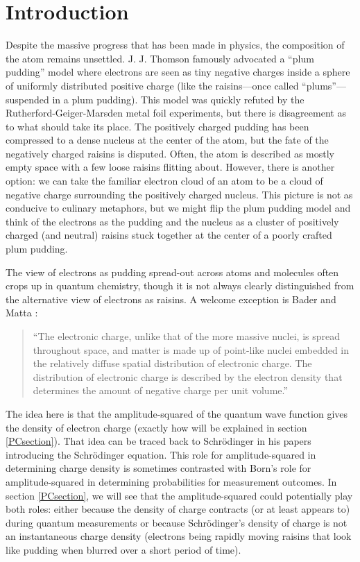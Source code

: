 \documentclass[12pt,onecolumn,secnumarabic,amsmath,amssymb,balancelastpage,nofootinbib]{article}
\begin{document}
\section{Introduction}\label{introsec}

Despite the massive progress that has been made in physics, the composition of the atom remains unsettled.  J. J. Thomson \cite{thomson1904} famously advocated a ``plum pudding'' model where electrons are seen as tiny negative charges inside a sphere of uniformly distributed positive charge (like the raisins---once called ``plums''---suspended in a plum pudding).  This model was quickly refuted by the Rutherford-Geiger-Marsden metal foil experiments, but there is disagreement as to what should take its place.  The positively charged pudding has been compressed to a dense nucleus at the center of the atom, but the fate of the negatively charged raisins is disputed.  Often, the atom is described as mostly empty space with a few loose raisins flitting about.  However, there is another option: we can take the familiar electron cloud of an atom to be a cloud of negative charge surrounding the positively charged nucleus.  This picture is not as conducive to culinary metaphors, but we might flip the plum pudding model and think of the electrons as the pudding and the nucleus as a cluster of positively charged (and neutral) raisins stuck together at the center of a poorly crafted plum pudding.

The view of electrons as pudding spread-out across atoms and molecules often crops up in quantum chemistry, though it is not always clearly distinguished from the alternative view of electrons as raisins.  A welcome exception is Bader and Matta \cite{bader2013}:
\begin{quote}
``The electronic charge, unlike that of the more massive nuclei, is spread throughout space, and matter is made up of point-like nuclei embedded in the relatively diffuse spatial distribution of electronic charge. The distribution of electronic charge is described by the electron density that determines the amount of negative charge per unit volume.'' \cite[pg.\ 255]{bader2013}
\end{quote}
The idea here is that the amplitude-squared of the quantum wave function gives the density of electron charge (exactly how will be explained in section \ref{PCsection}).  That idea can be traced back to Schr\"{o}dinger in his papers introducing the Schr\"{o}dinger equation.  This role for amplitude-squared in determining charge density is sometimes contrasted with Born's role for amplitude-squared in determining probabilities for measurement outcomes.  In section \ref{PCsection}, we will see that the amplitude-squared could potentially play both roles: either because the density of charge contracts (or at least appears to) during quantum measurements or because Schr\"{o}dinger's density of charge is not an instantaneous charge density (electrons being rapidly moving raisins that look like pudding when blurred over a short period of time).
\end{document}
